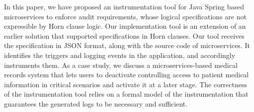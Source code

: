 In this paper, we have proposed an instrumentation tool for Java Spring based microservices to enforce audit requirements, whose logical specifications are not expressible by Horn clause logic. Our implementation tool is an extension of an earlier solution that supported specifications in Horn clauses. Our tool receives the specification in JSON format, along with the source code of microservices. It identifies the triggers and logging events in the application, and accordingly instruments them. As a case study, we discuss a microservices-based medical records system that lets users to deactivate controlling access to patient medical information in critical scenarios and activate it at a later stage. The correctness of the instrumentation tool relies on a formal model of the instrumentation that guarantees the generated logs to be necessary and sufficient.



